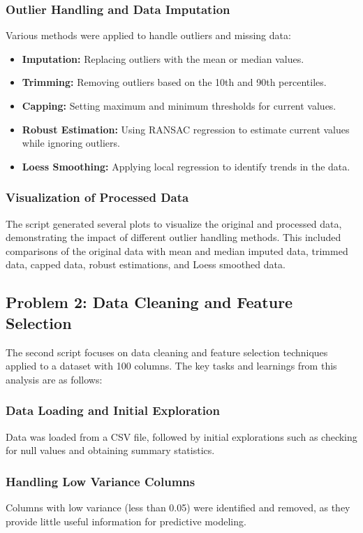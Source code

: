 \documentclass{article}
\begin{document}
\subsubsection{Outlier Handling and Data Imputation}
Various methods were applied to handle outliers and missing data:
\begin{itemize}
    \item \textbf{Imputation:} Replacing outliers with the mean or median values.
    \item \textbf{Trimming:} Removing outliers based on the 10th and 90th percentiles.
    \item \textbf{Capping:} Setting maximum and minimum thresholds for current values.
    \item \textbf{Robust Estimation:} Using RANSAC regression to estimate current values while ignoring outliers.
    \item \textbf{Loess Smoothing:} Applying local regression to identify trends in the data.
\end{itemize}

\subsubsection{Visualization of Processed Data}
The script generated several plots to visualize the original and processed data, demonstrating the impact of different outlier handling methods. This included comparisons of the original data with mean and median imputed data, trimmed data, capped data, robust estimations, and Loess smoothed data.

\subsection{Problem 2: Data Cleaning and Feature Selection}
The second script focuses on data cleaning and feature selection techniques applied to a dataset with 100 columns. The key tasks and learnings from this analysis are as follows:

\subsubsection{Data Loading and Initial Exploration}
Data was loaded from a CSV file, followed by initial explorations such as checking for null values and obtaining summary statistics.

\subsubsection{Handling Low Variance Columns}
Columns with low variance (less than 0.05) were identified and removed, as they provide little useful information for predictive modeling.
\end{document}
